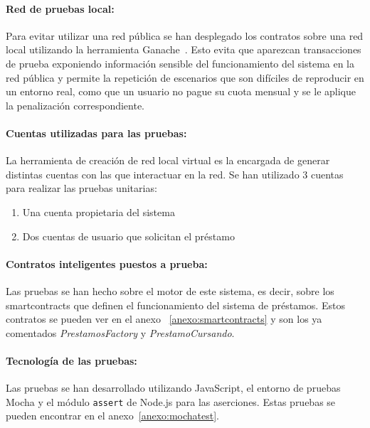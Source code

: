 \paragraph{Red de pruebas local:}
Para evitar utilizar una red pública se han desplegado los contratos sobre una red local utilizando la herramienta Ganache~\cite{[19]}.
Esto evita que aparezcan transacciones de prueba exponiendo información sensible del funcionamiento del  sistema en la red pública y 
permite la repetición de escenarios que son difíciles de reproducir en un entorno real, como que un usuario no pague su cuota mensual y se le aplique la penalización correspondiente.
\paragraph{Cuentas utilizadas para las pruebas:}
La herramienta de creación de red local virtual es la encargada de generar distintas cuentas con las que interactuar en la red.
Se han utilizado 3 cuentas para realizar las pruebas unitarias:
\begin{enumerate}
    \item Una cuenta propietaria del sistema
    \item Dos cuentas de usuario que solicitan el préstamo
\end{enumerate}
\paragraph{Contratos inteligentes puestos a prueba:}
Las pruebas se han hecho sobre el motor de este sistema, es decir, sobre los
\glspl{smartcontract} que definen el funcionamiento del sistema de préstamos.
Estos contratos se pueden ver en el anexo ~\ref{anexo:smartcontracts} y son los 
ya comentados \textit{PrestamosFactory} y \textit{PrestamoCursando}.

\paragraph{Tecnología de las pruebas:}
Las pruebas se han desarrollado utilizando JavaScript, el entorno de pruebas Mocha y
el módulo \texttt{assert} de Node.js para las aserciones.
Estas pruebas se pueden encontrar en el anexo~\ref{anexo:mochatest}.


